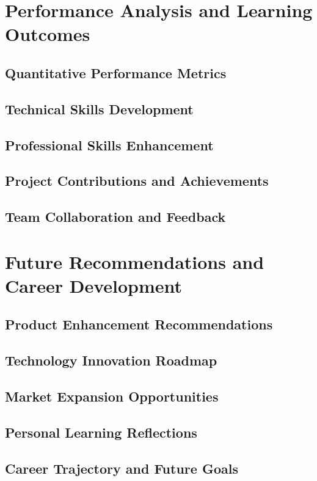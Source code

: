 \documentclass[a4paper, 11pt, oneside]{report}
\begin{document}
\chapter{Performance Analysis and Learning Outcomes}
  \section{Quantitative Performance Metrics}
  \section{Technical Skills Development}
  \section{Professional Skills Enhancement}
  \section{Project Contributions and Achievements}
  \section{Team Collaboration and Feedback}
  

\chapter{Future Recommendations and Career Development}
  \section{Product Enhancement Recommendations}
  \section{Technology Innovation Roadmap}
  \section{Market Expansion Opportunities}
  \section{Personal Learning Reflections}
  \section{Career Trajectory and Future Goals}
  
\end{document}
